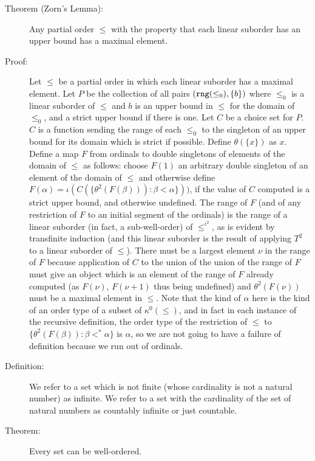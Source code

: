 \documentclass[12pt]{article}
\begin{document}
\begin{description}

\item[Theorem (Zorn's Lemma):]  Any partial order $\leq$ with the property that each linear suborder has an upper bound  has a maximal element.

\item[Proof:]  Let $\leq$ be a partial order in which each linear suborder has a maximal element.  Let $P$ be the collection of all pairs $({\tt rng}(\leq_0),\{b\})$ where $\leq_0$ is a linear suborder of $\leq$ and $b$ is an upper bound in $\leq$ for the domain of $\leq_0$, and a strict upper bound if there is one.  Let $C$ be a choice set for $P$.  $C$ is a function sending the range of each $\leq_0$ to
the singleton of an upper bound for its domain which is strict if possible.  Define $\theta(\{x\})$ as $x$.  Define a map $F$ from ordinals to double singletons of elements of the domain of $\leq$ as follows: choose $F(1)$ an arbitrary double singleton of an element of the domain of $\leq$ and otherwise define  $F(\alpha) =  \iota(C(\{\theta^2(F(\beta))):\beta<\alpha\}))$, if the value of $C$ computed is a strict upper bound, and otherwise undefined.  The range of $F$ (and of any restriction of $F$ to an initial segment of the ordinals)  is the range of a linear suborder (in fact, a sub-well-order) of $\leq^{\iota^2}$, as is evident by transfinite induction (and this linear suborder is the result of applying $T^2$ to a linear suborder of $\leq$).  There must be a largest element $\nu$ in
the range of $F$ because application of $C$ to  the union of the union of the range of $F$ must give an object which is an element of the range of $F$ already computed (as $F(\nu)$, $F(\nu+1)$ thus being undefined) and $\theta^2(F(\nu))$ must be a maximal element in $\leq$.  Note that the kind of $\alpha$ here is the kind of an order type of a subset of $\kappa^0(\leq)$, and in fact in each instance of the recursive definition, the order type of the restriction of $\leq$ to $\{\theta^2(F(\beta)):\beta<^*\alpha\}$ is $\alpha$, so we are not going to have a failure of definition because we run out of ordinals.

\item[Definition:]  We refer to a set which is not finite (whose cardinality is not a natural number) as infinite.  We refer to a set with the cardinality of the set of natural numbers as countably infinite or just countable.

\item[Theorem:]  Every set can be well-ordered.


\end{description}
\end{document}
